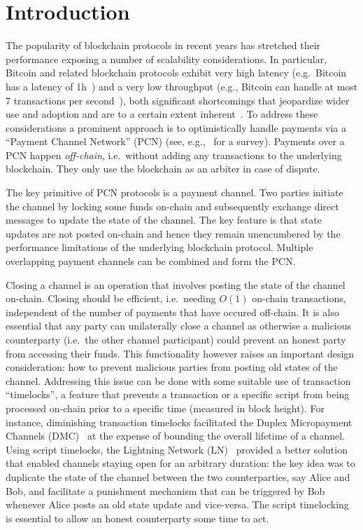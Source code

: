 \section{Introduction}
  The popularity of blockchain protocols in recent years has stretched their
  performance exposing a number of scalability considerations. In particular,
  Bitcoin and related blockchain protocols exhibit very high latency (e.g.\
  Bitcoin has a latency of 1h~\cite{bitcoin}) and a very low throughput (e.g.,
  Bitcoin can handle at most 7 transactions per second~\cite{scaling}), both
  significant shortcomings that jeopardize wider use and adoption and are to a
  certain extent inherent~\cite{scaling}. To address these considerations a
  prominent approach is to optimistically handle payments via a ``Payment
  Channel Network'' (PCN) (see, e.g.,~\cite{DBLP:conf/fc/GudgeonMRMG20} for a
  survey). Payments over a PCN happen \emph{off-chain}, i.e.\ without adding any
  transactions to the underlying blockchain. They only use the blockchain as an
  arbiter in case of dispute.

The key primitive of PCN protocols is a payment channel. Two parties initiate
the channel by locking some funds on-chain and subsequently exchange direct
messages to update the state of the channel. The key feature is that state
updates are not posted on-chain and hence they remain unencumbered by the
performance limitations of the underlying blockchain protocol. Multiple
overlapping payment channels can be combined and form the PCN.

Closing a channel is an operation that involves posting the state of the channel
on-chain. Closing should be efficient, i.e.\ needing $O(1)$ on-chain
transactions, independent of the number of payments that have occured off-chain.
It is also essential that any party can unilaterally close a channel as
otherwise a malicious counterparty (i.e.\ the other channel participant) could
prevent an honest party from accessing their funds. This functionality however
raises an important design consideration: how to prevent malicious parties from
posting old states of the channel.
%
Addressing this issue can be done with some suitable use of transaction
``timelocks'', a feature that prevents a transaction or a specific script from
being processed on-chain prior to a specific time (measured in block height).
%
For instance, diminishing transaction timelocks facilitated the Duplex
Micropayment Channels (DMC)~\cite{decker} at the expense of bounding the overall
lifetime of a channel. Using script timelocks, the Lightning Network
(LN)~\cite{lightning} provided a better solution that enabled channels staying
open for an arbitrary duration: the key idea was to duplicate the state of the
channel between the two counterparties, say Alice and Bob, and facilitate a
punishment mechanism that can be triggered by Bob whenever Alice posts an old
state update and vice-versa. The script timelocking is essential to allow an
honest counterparty some time to act.

